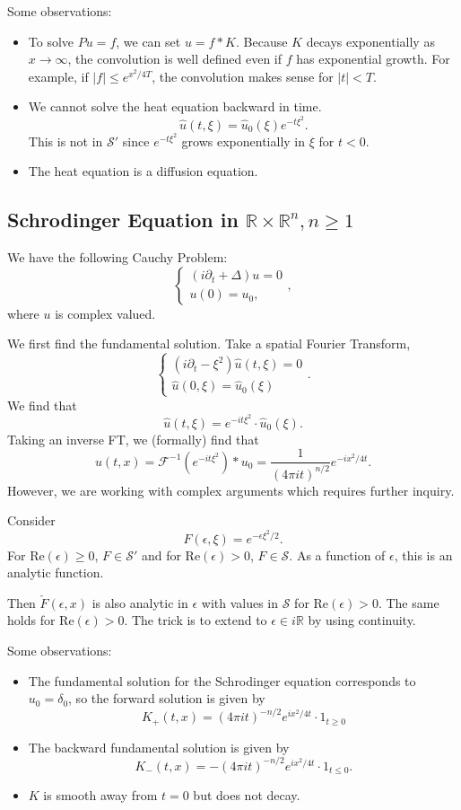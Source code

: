 \documentclass[12pt]{scrartcl}
\newcommand{\R}{\mathbb{R}}
\renewcommand{\hat}{\widehat}
\begin{document}
Some observations:
\begin{itemize}
\item To solve $Pu = f$, we can set $u = f * K$.  Because $K$ decays exponentially as $x \to \infty$, the convolution is well defined even if $f$ has exponential growth.  For example, if $|f| \le e^{x^2/4T}$, the convolution makes sense for $|t| < T$.
\item We cannot solve the heat equation backward in time.
$$\hat{u}(t, \xi) = \hat{u}_0(\xi) e^{-t\xi^2}.$$
This is not in $\mathcal S'$ since $e^{-t\xi^2}$ grows exponentially in $\xi$ for $t < 0$.
\item The heat equation is a diffusion equation.
\end{itemize}

\subsection{Schrodinger Equation in $\R \times \R^n, n \ge 1$}
We have the following Cauchy Problem:
$$\begin{cases}
(i \partial_t + \Delta) u = 0 \\
u(0) = u_0,
\end{cases},$$
where $u$ is complex valued.  

We first find the fundamental solution.  Take a spatial Fourier Transform,
$$\begin{cases}
(i\partial_t - \xi^2)\hat{u}(t, \xi) = 0 \\
\hat{u}(0, \xi) = \hat{u}_0(\xi)
\end{cases}.$$
We find that $$\hat{u}(t, \xi) = e^{-it\xi^2} \cdot \hat{u}_0(\xi).$$
Taking an inverse FT, we (formally) find that 
$$u(t, x) = \mathcal F^{-1}(e^{-it\xi^2}) * u_0 = \frac{1}{(4 \pi i t)^{n/2}} e^{-ix^2/4t}.$$
However, we are working with complex arguments which requires further inquiry.  

Consider 
$$F(\epsilon,\xi) = e^{-\epsilon \xi^2/2}.$$
For $\text{Re}(\epsilon) \ge 0$, $F \in \mathcal S'$ and for $\text{Re}(\epsilon) > 0$, $F \in \mathcal S$.  As a function of $\epsilon$, this is an analytic function.

Then $\check{F}(\epsilon, x)$ is also analytic in $\epsilon$ with values in $\mathcal S$ for $\text{Re}(\epsilon) > 0$.  The same holds for $\text{Re}(\epsilon) > 0$.  
The trick is to extend to $\epsilon \in i\R$ by using continuity.

Some observations:
\begin{itemize}
\item The fundamental solution for the Schrodinger equation corresponds to $u_0 = \delta_0$, so the forward solution is given by $$K_+(t, x) = (4 \pi i t)^{-n/2} e^{ix^2/4t} \cdot 1_{t \ge 0}$$
\item The backward fundamental solution is given by 
$$K_-(t, x) = -(4 \pi i t)^{-n/2} e^{ix^2/4t} \cdot 1_{t \le 0}.$$
\item $K$ is smooth away from $t=0$ but does not decay.
\end{itemize}
\pagebreak
\end{document}
